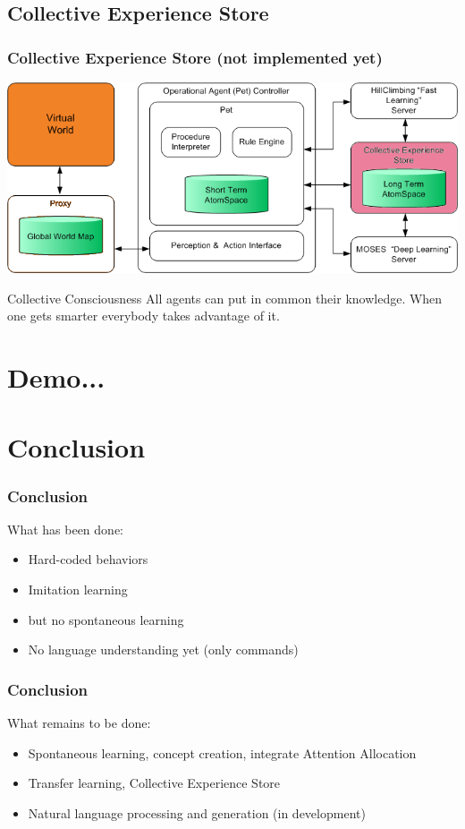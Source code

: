 \documentclass{beamer}
\begin{document}
\subsection{Collective Experience Store}

\frame
{
  \frametitle{Collective Experience Store (not implemented yet)}

  \begin{center}
    \includegraphics[scale=0.3]{EmbodimentSystemArchitecture_4.png}
  \end{center}

  \begin{beamerboxesrounded}{Collective Consciousness}
    All agents can put in common their knowledge. When one gets smarter
    everybody takes advantage of it.
  \end{beamerboxesrounded}

}

\section{Demo...}

\section{Conclusion}

\frame
{
  \frametitle{Conclusion}

   \begin{beamerboxesrounded}{What \alert{has been done}:}
     \begin{itemize}
     \item \alert{Hard-coded} behaviors
     \item Imitation learning
     \item but \alert{no spontaneous learning}
     \item No language understanding yet (only commands)
     \end{itemize}
   \end{beamerboxesrounded}
 }

 \frame
 {
   \frametitle{Conclusion}

  \begin{beamerboxesrounded}{What \alert{remains to be done}:}
    \begin{itemize}
    \item Spontaneous learning, concept creation, integrate Attention Allocation
    \item Transfer learning, Collective Experience Store
    \item Natural language processing and generation (in development)
    \end{itemize}
  \end{beamerboxesrounded}
 }
\end{document}
